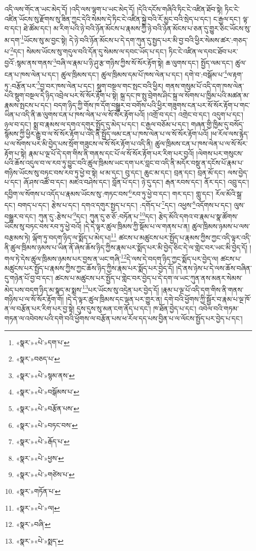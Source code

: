 འདི་ལས་གོང་ན་ཡང་མེད་དོ། །འདི་ལས་ལྷག་པ་ཡང་མེད་དོ། །དེའི་དངོས་གཞིའི་ཏིང་ངེ་འཛིན་ཐོབ་སྟེ། ཏིང་ངེ་འཛིན་ཡོངས་སུ་རྫོགས་སུ་ཟིན་ཀྱང་དེའི་སེམས་དེ་ཏིང་ངེ་འཛིན་སྐྱེ་བའི་རོ་མྱང་བའི་སྲེད་པ་དང་། ང་རྒྱལ་དང་། ལྟ་བ་དང་། ཐེ་ཚོམ་དང་། མ་རིག་པའི་ཉེ་བའི་ཉོན་མོངས་པ་རྣམས་ཀྱི་ཉེ་བའི་ཉོན་མོངས་པ་ཅན་དུ་གྱུར་ཅིང་ཡོངས་སུ་མ་དག་\footnote{«སྣར་»«པེ་»དག་པ་}ཡོངས་སུ་མ་བྱང་སྟེ། དེ་ཉེ་བའི་ཉོན་མོངས་པ་དེ་དག་ཀུན་དུ་སྤྱད་པར་མི་བྱ་བའི་ཕྱིར་སེམས་ཚར་:གཅད་པ་\footnote{«སྣར་»བཅད་པ་}དང་། སེམས་ཡོངས་སུ་གདུལ་བའི་དོན་དུ་སེམས་ལ་དབང་ཡོད་པ་དང་། ཏིང་ངེ་འཛིན་ལ་དབང་ཐོབ་པར་བྱའོ་:སྙམ་ནས་གནས་\footnote{«སྣར་»«པེ་»སྙམ་ནས་}བཞི་ལ་རྣམ་པ་ཉི་ཤུ་རྩ་གཉིས་ཀྱིས་སོ་སོར་རྟོག་སྟེ། ཆ་ལུགས་དང་། སྤྱོད་ལམ་དང་། ཚུལ་ངན་པ་ཁས་ལེན་པ་དང་། ཚུལ་ཁྲིམས་དང་། ཚུལ་ཁྲིམས་དམ་པོ་ཁས་ལེན་པ་དང་། དགེ་བ་:བསྒོམ་པ་\footnote{«སྣར་»«པེ་»བསྒོམས་པ་}ལ་རྟག་ཏུ་:བརྩོན་པར་\footnote{«སྣར་»«པེ་»བརྩོན་པས་}བྱ་བར་ཁས་ལེན་པ་དང་། སྡུག་བསྔལ་གང་སྤང་བའི་ཕྱིར། གནས་གསུམ་པོ་འདི་དག་ཁས་ལེན་པའི་སྡུག་བསྔལ་དེ་ཉིད་འབྲེལ་པར་སོ་སོར་རྟོག་པ་སྟེ། སྐྲ་དང་ཁ་སྤུ་བྲེགས་ཤིང་སྐྲ་ལ་སོགས་པ་ཁྱིམ་པའི་མཚན་མ་རྣམས་སྤངས་པ་དང་། བདག་ཉིད་ཀྱི་གོས་ཁ་དོག་བསྒྱུར་བ་བགོས་པའི་ཕྱིར་གཟུགས་ངན་པར་སོ་སོར་རྟོག་པ་གང་ཡིན་པ་འདི་ནི་ཆ་ལུགས་ངན་པ་ཁས་ལེན་པ་ལ་སོ་སོར་རྟོག་པའོ། །འགྲོ་བ་དང་། འགྲེང་བ་དང་། འདུག་པ་དང་། ཉལ་བ་དང་། སྨྲ་བ་རྣམས་ལ་དགའ་དགུར་སྤྱོད་དུ་མེད་པ་དང་། ང་རྒྱལ་བཅོམ་པ་དང་། གཞན་གྱི་ཁྱིམ་དུ་བསོད་སྙོམས་ཀྱི་ཕྱིར་རྒྱུ་བ་ལ་སོ་སོར་རྟོག་པ་འདི་ནི་སྤྱོད་ལམ་ངན་པ་ཁས་ལེན་པ་ལ་སོ་སོར་རྟོག་པའོ། །ཕ་རོལ་ལས་རྙེད་པ་ལ་སོགས་པར་མི་བྱེད་པས་སྲོག་གཟུངས་ལ་སོ་སོར་རྟོག་པ་འདི་ནི། ཚུལ་ཁྲིམས་ངན་པ་ཁས་ལེན་པ་ལ་སོ་སོར་རྟོག་པ་སྟེ། རྣམ་པ་ལྔ་པོ་དེ་དག་གིས་ནི་གནས་དང་པོ་ལ་སོ་སོར་རྟོག་པར་རིག་པར་བྱའོ། །ལེགས་པར་གསུངས་པའི་ཆོས་འདུལ་བ་ལ་རབ་ཏུ་བྱུང་བའི་ཚུལ་ཁྲིམས་ཡང་དག་པར་བླང་བ་འདི་ནི་མདོར་བསྡུ་ན་དངོས་པོ་རྣམ་པ་གཉིས་ཡོངས་སུ་བཏང་བས་རབ་ཏུ་ཕྱེ་བ་སྟེ། ཕ་མ་དང་། བུ་དང་། ཆུང་མ་དང་། བྲན་དང་། བྲན་མོ་དང་། ལས་བྱེད་པ་དང་། ཞོ་ཤས་འཚོ་བ་དང་། མཛའ་བཤེས་དང་། བློན་པོ་དང་། ཉེ་དུ་དང་། རྒན་རབས་དང་། ནོར་དང་། འབྲུ་དང་། དབྱིག་ལ་སོགས་པ་འདོད་པ་རྣམས་ཡོངས་སུ་:གཏང་བས་\footnote{«སྣར་»«པེ་»བཏང་བས་}རབ་ཏུ་ཕྱེ་བ་དང་། གར་དང་། གླུ་དང་། རོལ་མོའི་སྒྲ་དང་། བགད་པ་དང་། རྩེས་པ་དང་། དགའ་དགུར་སྤྱད་པ་དང་། :དགོད་པ་\footnote{«སྣར་»«པེ་»རྒོད་པ་}དང་། འཕྱས་\footnote{«སྣར་»«པེ་»ཕྱས་}འདོགས་པ་དང་། ལུས་བསྒྱུར་བ་དང་། ཀུན་དུ་:རྩེས་པ་\footnote{«སྣར་»«པེ་»གཙེས་པ་}དང་། ཀུན་དུ་ཅ་ཅོ་:བཏོན་པ་\footnote{«སྣར་»གཏོན་པ་}དང་། རྩེད་མོའི་དགའ་བ་རྣམ་པ་སྣ་ཚོགས་ཡོངས་སུ་བཏང་བས་རབ་ཏུ་ཕྱེ་བའོ། །དེ་དེ་ལྟར་ཚུལ་ཁྲིམས་ཀྱི་སྡོམ་པ་ལ་གནས་པ་ན། ཚུལ་ཁྲིམས་ཉམས་པ་ལས་བརྩམས་ཏེ། ལྐོག་ཏུ་བདག་ཉིད་ལ་སྨོད་པ་མེད་པ།\footnote{«སྣར་»«པེ་»ལ།} ཚངས་པ་མཚུངས་པར་སྤྱོད་པ་རྣམས་ཀྱིས་ཀྱང་འདི་ལྟར་འདི་ནི་ཚུལ་ཁྲིམས་ཉམས་པ་ཡིན་ནོ་ཞེས་ཆོས་ཉིད་ཀྱིས་རྣམ་པར་སྨོད་པར་མི་བྱེད་ཅིང་དེ་ལ་གླེང་བར་ཡང་མི་བྱེད་དོ། །གལ་ཏེ་དེས་ཚུལ་ཁྲིམས་ཉམས་པར་བྱས་ན་ཡང་གཞི་\footnote{«སྣར་»བཞི་}དེ་ལས་དེ་བདག་ཉིད་ཀྱང་སྨོད་པར་བྱེད་ལ། ཚངས་པ་མཚུངས་པར་སྤྱོད་པ་རྣམས་ཀྱིས་ཀྱང་ཆོས་ཉིད་ཀྱིས་རྣམ་པར་སྨོད་པར་བྱེད་དོ། །དེ་ནས་ཉེས་པ་དེ་ལས་ཆོས་བཞིན་དུ་གཉེན་པོ་བྱ་བ་དང་། ཚངས་པ་མཚུངས་པར་སྤྱོད་པ་གླེང་བར་བྱེད་པ་དེ་དག་ལ་ཡང་ཀུན་ནས་མནར་སེམས་མེད་པས་བདག་ཉིད་མ་སྣད་མ་སྨས་\footnote{«སྣར་»«པེ་»སྨད་}པར་ཡོངས་སུ་འདྲེན་པར་བྱེད་དོ། །རྣམ་པ་ལྔ་པོ་འདི་དག་གིས་ནི་གནས་གཉིས་པ་ལ་སོ་སོར་རྟོག་གོ། །དེ་དེ་ལྟར་ཚུལ་ཁྲིམས་དང་ལྡན་པར་གྱུར་ན། དགེ་བའི་ཕྱོགས་ཀྱི་སྦྱོར་བ་རྣམ་པ་ལྔ་ཁོ་ན་ལ་བརྩོན་པར་རིག་པར་བྱ་སྟེ། དུས་དུས་སུ་མན་ངག་ནོད་པ་དང་། ཁ་ཐོན་བྱེད་པ་དང་། འབེལ་བའི་གཏམ་གཏན་ལ་འབེབས་པའི་དགེ་བའི་ཕྱོགས་ལ་བརྩོན་པས་ཕ་རོལ་དད་པས་བྱིན་པ་ལ་ལོངས་སྤྱོད་པར་བྱེད་པ་དང་། 